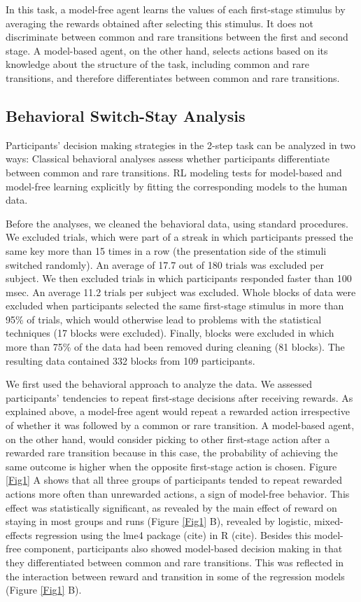 \documentclass[11pt]{article} %
\begin{document}
In this task, a model-free agent learns the values of each first-stage stimulus by averaging the rewards obtained after selecting this stimulus. It does not discriminate between common and rare transitions between the first and second stage. A model-based agent, on the other hand, selects actions based on its knowledge about the structure of the task, including common and rare transitions, and therefore differentiates between common and rare transitions.

\subsection{Behavioral Switch-Stay Analysis}
Participants' decision making strategies in the 2-step task can be analyzed in two ways: Classical behavioral analyses assess whether participants differentiate between common and rare transitions. RL modeling tests for model-based and model-free learning explicitly by fitting the corresponding models to the human data.

Before the analyses, we cleaned the behavioral data, using standard procedures. We excluded trials, which were part of a streak in which participants pressed the same key more than 15 times in a row (the presentation side of the stimuli switched randomly). An average of 17.7 out of 180 trials was excluded per subject. We then excluded trials in which participants responded faster than 100 msec. An average 11.2 trials per subject was excluded. Whole blocks of data were excluded when participants selected the same first-stage stimulus in more than 95\% of trials, which would otherwise lead to problems with the statistical techniques (17 blocks were excluded). Finally, blocks were excluded in which more than 75\% of the data had been removed during cleaning (81 blocks). The resulting data contained 332 blocks from 109 participants.

We first used the behavioral approach to analyze the data. We assessed participants' tendencies to repeat first-stage decisions after receiving rewards. As explained above, a model-free agent would repeat a rewarded action irrespective of whether it was followed by a common or rare transition. A model-based agent, on the other hand, would consider picking to other first-stage action after a rewarded rare transition because in this case, the probability of achieving the same outcome is higher when the opposite first-stage action is chosen. Figure \ref{Fig1} A shows that all three groups of participants tended to repeat rewarded actions more often than unrewarded actions, a sign of model-free behavior. This effect was statistically significant, as revealed by the main effect of reward on staying in most groups and runs (Figure \ref{Fig1} B), revealed by logistic, mixed-effects regression using the lme4 package (cite) in R (cite). Besides this model-free component, participants also showed model-based decision making in that they differentiated between common and rare transitions. This was reflected in the interaction between reward and transition in some of the regression models (Figure \ref{Fig1} B).
\end{document}
